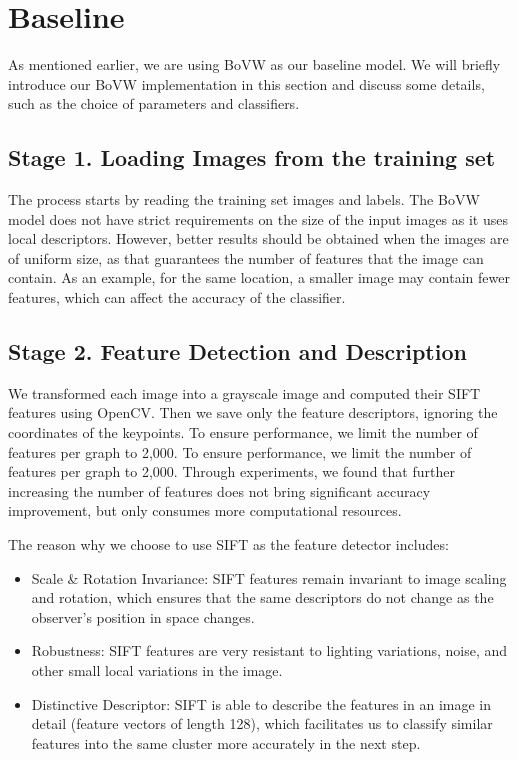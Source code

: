 \documentclass[conference]{IEEEtran}
\begin{document}
\section{Baseline}

As mentioned earlier, we are using BoVW as our baseline model. We will briefly introduce our BoVW implementation in this section and discuss some details, such as the choice of parameters and classifiers.

\subsection*{Stage 1. Loading Images from the training set}

The process starts by reading the training set images and labels. The BoVW model does not have strict requirements on the size of the input images as it uses local descriptors. However, better results should be obtained when the images are of uniform size, as that guarantees the number of features that the image can contain. As an example, for the same location, a smaller image may contain fewer features, which can affect the accuracy of the classifier.

\subsection*{Stage 2. Feature Detection and Description}

We transformed each image into a grayscale image and computed their SIFT features using OpenCV. Then we save only the feature descriptors, ignoring the coordinates of the keypoints. To ensure performance, we limit the number of features per graph to 2,000. To ensure performance, we limit the number of features per graph to 2,000. Through experiments, we found that further increasing the number of features does not bring significant accuracy improvement, but only consumes more computational resources.

The reason why we choose to use SIFT as the feature detector includes:

\begin{itemize}
    \item Scale \& Rotation Invariance: SIFT features remain invariant to image scaling and rotation, which ensures that the same descriptors do not change as the observer's position in space changes.
    \item Robustness: SIFT features are very resistant to lighting variations, noise, and other small local variations in the image.
    \item Distinctive Descriptor: SIFT is able to describe the features in an image in detail (feature vectors of length 128), which facilitates us to classify similar features into the same cluster more accurately in the next step.
\end{itemize}
\end{document}
